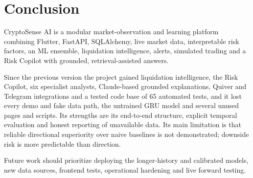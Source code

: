 \section{Conclusion}
CryptoSense AI is a modular market-observation and learning platform combining Flutter, FastAPI, SQLAlchemy, live market data, interpretable risk factors, an ML ensemble, liquidation intelligence, alerts, simulated trading and a Risk Copilot with grounded, retrieval-assisted answers.

Since the previous version the project gained liquidation intelligence, the Risk Copilot, six specialist analysts, Claude-based grounded explanations, Quiver and Telegram integrations and a tested code base of 65 automated tests, and it lost every demo and fake data path, the untrained GRU model and several unused pages and scripts. Its strengths are its end-to-end structure, explicit temporal evaluation and honest reporting of unavailable data. Its main limitation is that reliable directional superiority over naive baselines is not demonstrated; downside risk is more predictable than direction.

Future work should prioritize deploying the longer-history and calibrated models, new data sources, frontend tests, operational hardening and live forward testing.
